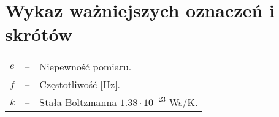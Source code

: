 \chapter*{Wykaz ważniejszych oznaczeń i skrótów}

\begin{tabular}{@{} l l p{} @{}}
    $e$ & -- & Niepewność pomiaru.                          \\
    $f$ & -- & Częstotliwość [Hz].                          \\
    $k$ & -- & Stała Boltzmanna $1.38 \cdot 10^{-23}$ Ws/K. \\
\end{tabular}
